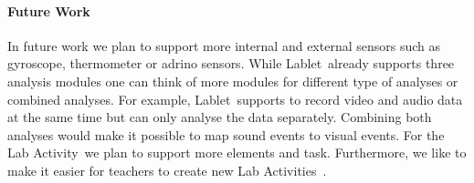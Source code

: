 \documentclass{sigchi}
\newcommand{\lablet}{Lablet\ }
\newcommand{\labactivity}{Lab Activity\ }
\newcommand{\labactivities}{Lab Activities\ }
\begin{document}
\paragraph{Future Work}
In future work we plan to support more internal and external sensors such as gyroscope, thermometer or adrino sensors.
While \lablet already supports three analysis modules one can think of more modules for different type of analyses or combined analyses.
For example, \lablet supports to record video and audio data at the same time but can only analyse the data separately.
Combining both analyses would make it possible to map sound events to visual events.
For the \labactivity we plan to support more elements and task.
Furthermore, we like to make it easier for teachers to create new \labactivities.




\end{document}
